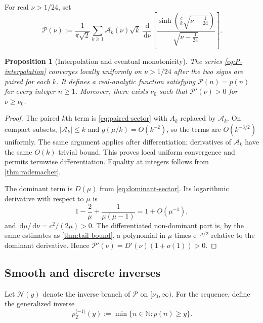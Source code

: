 \documentclass[11pt,a4paper]{article}
\numberwithin{equation}{section}
\newtheorem{proposition}[theorem]{Proposition}
\theoremstyle{definition}
\theoremstyle{remark}
\newcommand{\e}{\mathrm e}
\newcommand{\dd}{\,\mathrm d}
\newcommand{\N}{\mathbb N}
\newcommand{\Z}{\mathbb Z}
\newcommand{\Acal}{\mathcal A}
\newcommand{\Pcal}{\mathcal P}
\newcommand{\Ncal}{\mathcal N}
\newcommand{\abs}[1]{\lvert#1\rvert}
\begin{document}
For real $\nu>1/24$, set
\begin{equation}\label{eq:P-interpolation}
 \Pcal(\nu):=\frac1{\pi\sqrt2}\sum_{k\geq1}
 \Acal_k(\nu)\sqrt{k}\,\frac{\dd}{\dd \nu}
 \left[
 \frac{\sinh\!\left(\frac{c}{k}\sqrt{\nu-\frac1{24}}\right)}
      {\sqrt{\nu-\frac1{24}}}
 \right].
\end{equation}

\begin{proposition}[Interpolation and eventual monotonicity]\label{prop:interpolation}
The series \eqref{eq:P-interpolation} converges locally uniformly on
$\nu>1/24$ after the two signs are paired for each $k$.  It defines a
real-analytic function satisfying $\Pcal(n)=p(n)$ for every integer $n\geq1$.
Moreover, there exists $\nu_0$ such that $\Pcal'(\nu)>0$ for
$\nu\geq\nu_0$.
\end{proposition}

\begin{proof}
The paired $k$th term is \eqref{eq:paired-sector} with $A_k$ replaced by
$\Acal_k$.  On compact subsets, $\abs{\Acal_k}\leq k$ and
$g(\mu/k)=O(k^{-2})$, so the terms are $O(k^{-3/2})$ uniformly.  The same
argument applies after differentiation; derivatives of $\Acal_k$ have the same
$O(k)$ trivial bound.  This proves local uniform convergence and permits
termwise differentiation.  Equality at integers follows from
\cref{thm:rademacher}.

The dominant term is $D(\mu)$ from \eqref{eq:dominant-sector}.  Its logarithmic
derivative with respect to $\mu$ is
\begin{equation}\label{eq:F0prime-preview}
 1-\frac2\mu+\frac1{\mu(\mu-1)}=1+O(\mu^{-1}),
\end{equation}
and $\dd\mu/\dd\nu=c^2/(2\mu)>0$.  The differentiated non-dominant part is,
by the same estimates as \cref{thm:tail-bound}, a polynomial in $\mu$ times
$\e^{-\mu/2}$ relative to the dominant derivative.  Hence
$\Pcal'(\nu)=D'(\nu)(1+o(1))>0$.
\end{proof}

\subsection{Smooth and discrete inverses}

Let $\Ncal(y)$ denote the inverse branch of $\Pcal$ on
$[\nu_0,\infty)$.  For the sequence, define the generalized inverse
\begin{equation}\label{eq:integer-inverse}
 p_{\Z}^{\langle-1\rangle}(y):=
 \min\{n\in\N:p(n)\geq y\}.
\end{equation}
\end{document}

